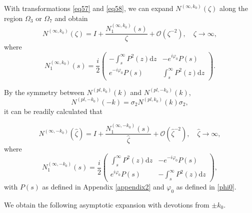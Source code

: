 \documentclass[11pt]{article}
\numberwithin{equation}{section}
\begin{document}
With  transformations  \eqref{eq57} and \eqref{eq58},  we can expand $N^{(\infty,k_0)} (\zeta)$ along the  region $\Omega_3$ or $\Omega_7$ and obtain
\begin{equation}
N^{(\infty,k_0)} (\zeta) = I + \frac{ N_1^{(\infty,k_0)} ( s)}{\zeta}+ \mathcal{O} \left(\zeta^{-2 }\right), \quad \zeta \to \infty,
\end{equation}
where
 \begin{equation}\label{eq60}
N_1^{(\infty,k_0)} ( s)
=   \frac{{ i}}{2} \begin{pmatrix}
-\int_s^\infty P^2(z)\mathrm{d}z &- e^{i\varphi_0 }P(s) \\  e^{-i\varphi_0 }P(s) &   \int_s^\infty P^2(z)\mathrm{d}z
 \end{pmatrix}.
\end{equation}



By the symmetry between $N^{(pl,k_0)} ( k)$ and $N^{(pl,-k_0)} ( k)$,
\begin{equation}
    N^{(pl,-k_0)} (- k)=\sigma_2N^{(pl,k_0)} ( k)\sigma_2,
\end{equation}
it can be readily calculated that

\begin{equation}
N^{(\infty,-k_0)} (\hat\zeta) = I + \frac{ N_1^{(\infty,-k_0)} ( s)}{\hat\zeta}+ \mathcal{O} \left(\hat\zeta^{-2 }\right), \quad \hat\zeta \to \infty,
\end{equation}
where
 \begin{equation}\label{eq61}
N_1^{(\infty,-k_0)} ( s)
= \frac{{i}}{2} \begin{pmatrix}
  \int_s^\infty P^2(z)\mathrm{d}z &- e^{-i\varphi_0 }P(s) \\  e^{i\varphi_0 }P(s) &-\int_s^\infty P^2(z)\mathrm{d}z
 \end{pmatrix},
\end{equation}
with $P(s)$ as defined in Appendix \ref{appendix2} and $\varphi_0$ as defined in \eqref{phi0}.

We obtain the following asymptotic expansion with devotions from $\pm k_0$.
\end{document}
